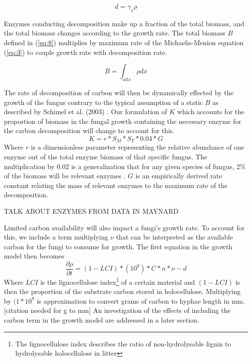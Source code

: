 \documentclass[12pt]{article}
\begin{document}
\begin{multicols}{2}
\begin{equation}
d = \gamma_{1}\rho
\end{equation}

Enzymes conducting decomposition make up a fraction of the total biomass, and the total biomass changes according to the growth rate. The total biomass $B$ defined in (\ref{eq:8}) multiplies by maximum rate of the Michaelis-Menion equation (\ref{eq:3}) to couple growth rate with decomposition rate. 

\begin{equation} \label {eq:8}
B = \int_{all x}\rho dx
\end{equation}

The rate of decomposition of carbon will then be dynamically effected by the growth of the fungus contrary to the typical assumption of a static $B$ as described by Schimel et al. (2003) \cite{Schimel2003}. Our formulation of $K$ which accounts for the proportion of biomass in the fungal growth containing the necessary enzyme for the carbon decomposition will change to account for this. 
\begin{equation} \label {eq}
K = r*S_{M}*S_{T}*0.04*G
\end{equation}
Where $r$ is a dimensionless parameter representing the relative abundance of one enzyme out of the total enzyme biomass of that specific fungus. The multiplication by $0.02$ is a generalization that for any given species of fungus, 2\% of the biomass will be relevant enzymes \cite{Moorhead2006}. $G$ is an empirically derived rate constant relating the mass of relevant enzymes to the maximum rate of the decomposition.

TALK ABOUT ENZYMES FROM DATA IN MAYNARD

Limited carbon availability will also impact a fungi's growth rate. To account for this, we include a term multiplying $\nu$ that can be interpreted as the available carbon for the fungi to consume for growth. The first equation in the growth model then becomes
\begin{equation} \label{eq:10}
\frac{\partial \rho}{\partial t} = (1-LCI)*(10^{9})*C*n*\nu - d
\end{equation}
Where $LCI$ is the lignocellulose index\footnote{The lignocellulose index describes the ratio of non-hydrolysable lignin to hydrolysable holocellulose in litter} of a certain material and $(1-LCI)$ is then the proportion of the substrate carbon stored in holocellulose. Multiplying by $(1*10^{9}$ is approximation to convert grams of carbon to hyphae length in mm. [citation needed for g to mm] An investigation of the effects of including the carbon term in the growth model are addressed in a later section. \\


\end{multicols}
\end{document}
